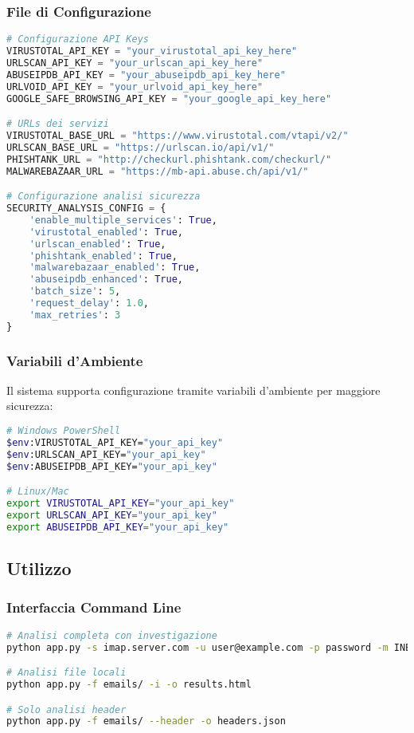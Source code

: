 \documentclass{article}
\begin{document}
\subsubsection{File di Configurazione}
\begin{lstlisting}[language=Python, caption=Configurazione chiavi API]
# Configurazione API Keys
VIRUSTOTAL_API_KEY = "your_virustotal_api_key_here"
URLSCAN_API_KEY = "your_urlscan_api_key_here"
ABUSEIPDB_API_KEY = "your_abuseipdb_api_key_here"
URLVOID_API_KEY = "your_urlvoid_api_key_here"
GOOGLE_SAFE_BROWSING_API_KEY = "your_google_api_key_here"

# URLs dei servizi
VIRUSTOTAL_BASE_URL = "https://www.virustotal.com/vtapi/v2/"
URLSCAN_BASE_URL = "https://urlscan.io/api/v1/"
PHISHTANK_URL = "http://checkurl.phishtank.com/checkurl/"
MALWAREBAZAAR_URL = "https://mb-api.abuse.ch/api/v1/"

# Configurazione analisi sicurezza
SECURITY_ANALYSIS_CONFIG = {
    'enable_multiple_services': True,
    'virustotal_enabled': True,
    'urlscan_enabled': True,
    'phishtank_enabled': True,
    'malwarebazaar_enabled': True,
    'abuseipdb_enhanced': True,
    'batch_size': 5,
    'request_delay': 1.0,
    'max_retries': 3
}
\end{lstlisting}

\subsubsection{Variabili d'Ambiente}
Il sistema supporta configurazione tramite variabili d'ambiente per maggiore sicurezza:

\begin{lstlisting}[language=bash, caption=Configurazione ambiente]
# Windows PowerShell
$env:VIRUSTOTAL_API_KEY="your_api_key"
$env:URLSCAN_API_KEY="your_api_key"
$env:ABUSEIPDB_API_KEY="your_api_key"

# Linux/Mac
export VIRUSTOTAL_API_KEY="your_api_key"
export URLSCAN_API_KEY="your_api_key"
export ABUSEIPDB_API_KEY="your_api_key"
\end{lstlisting}

\subsection{Utilizzo}

\subsubsection{Interfaccia Command Line}
\begin{lstlisting}[language=bash, caption=Esempi utilizzo CLI]
# Analisi completa con investigazione
python app.py -s imap.server.com -u user@example.com -p password -m INBOX -o emails --complete --investigate

# Analisi file locali
python app.py -f emails/ -i -o results.html

# Solo analisi header
python app.py -f emails/ --header -o headers.json
\end{lstlisting}
\end{document}
